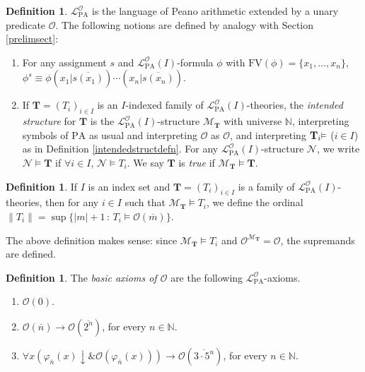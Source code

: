 \documentclass[reqno]{article}
\theoremstyle{definition}
\newtheorem{definition}[theorem]{Definition}
\def\N{\mathbb{N}}
\def\L{\mathscr{L}}
\def\M{\mathscr{M}}
\def\T{\mathbf{T}}
\def\O{\mathcal{O}}
\def\FV{\mathrm{FV}}
\def\LPO{\L^{\mathcal{O}}_{\mathrm{PA}}}
\renewcommand{\Pr}[1]{\T_{#1}\mbox{\small${\vDash}$}}
\begin{document}
\begin{definition}
$\LPO$ is the language of Peano arithmetic extended by
a unary predicate $\O$.
%
%
The following notions are defined by analogy with Section \ref{prelimsect}:
\begin{enumerate}
\item For any assignment $s$ and $\LPO(I)$-formula $\phi$ with $\FV(\phi){=}\{x_1,\ldots,x_n\}$,
$\phi^s\equiv\phi(x_1|\overline{s(x_1)})\cdots(x_n|\overline{s(x_n)})$.
\item If $\T=(T_i)_{i\in I}$ is an $I$-indexed family of $\LPO(I)$-theories,
the \emph{intended structure} for $\T$ is the $\LPO(I)$-structure
$\M_\T$ with universe $\N$, interpreting symbols of $\mathrm{PA}$ as usual
and interpreting $\O$ as $\mathcal O$, and interpreting $\Pr i$ ($i\in I$)
as in Definition \ref{intendedstructdefn}.
For any $\LPO(I)$-structure $\mathscr N$, we write $\mathscr N\models \T$
if $\forall i\in I$, $\mathscr N\models T_i$.
We say $\T$ is \emph{true} if $\M_\T\models\T$.
%
%
\end{enumerate}
\end{definition}

\begin{definition}
If $I$ is an index set and 
$\T=(T_i)_{i\in I}$ is a family of $\LPO(I)$-theories,
then for any $i\in I$
such that $\M_\T\models T_i$,
we define the ordinal $\|T_i\|=\sup\{|m|+1\,:\,T_i\models\O(\overline m)\}$.
\end{definition}

The above definition makes sense:
since $\M_\T\models T_i$
and $\O^{\M_\T}=\O$,
the supremands are defined.



\begin{definition}
\label{basicaxiomsofodefn}
The \emph{basic axioms of $\O$} are the following $\LPO$-axioms.
\begin{enumerate}
\item $\O(0)$.
\item $\O(\overline n)\rightarrow \O(\overline{2^n})$, for every $n\in\N$.
\item $\forall x(\varphi_{\overline n}(x){\downarrow}\mathrel{\&}\O(\varphi_{\overline n}(x)))
\rightarrow
\O(\overline{3\cdot 5^n})$, for every $n\in\N$.
\end{enumerate}
\end{definition}
\end{document}

